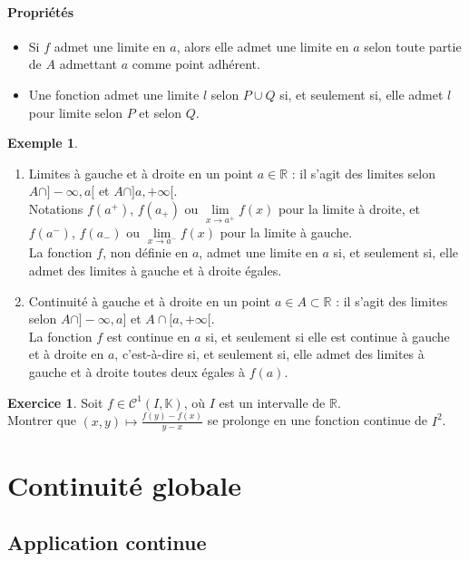 \documentclass[french]{article}
\newcommand{\R}{\mathbb{R}}
\newcommand{\K}{\mathbb{K}}
\theoremstyle{plain}
\theoremstyle{definition}
\newtheorem*{ex}{Exemple}
\newtheorem{exo}{Exercice}
\theoremstyle{remark}
\begin{document}
\paragraph{Propriétés}
\begin{itemize}
	\item Si $f$ admet une limite en $a$, alors elle admet une limite en $a$ selon toute partie de $A$ admettant $a$ comme point adhérent.
	\item Une fonction admet une limite $l$ selon $P\cup Q$ si, et seulement si, elle admet $l$ pour limite selon $P$ et selon $Q$.
\end{itemize}

\begin{ex}
	\begin{enumerate}
		\item Limites à gauche et à droite en un point $a\in\R$ : il s'agit des limites selon $A\cap]-\infty,a[$ et $A\cap]a,+\infty[$.\\
		Notations $f(a^+)$, $f(a_+)$ ou $\underset{x\to a^+}{\lim}f(x)$ pour la limite à droite, et $f(a^-)$, $f(a_-)$ ou $\underset{x\to a^-}{\lim}f(x)$ pour la limite à gauche. \\
		La fonction $f$, non définie en $a$, admet une limite en $a$ si, et seulement si, elle admet des limites à gauche et à droite égales.
		\item Continuité à gauche et à droite en un point $a\in A\subset\R$ : il s'agit des limites selon $A\cap]-\infty,a]$ et $A\cap[a,+\infty[$.\\
		La fonction $f$ est continue en $a$ si, et seulement si elle est continue à gauche et à droite en $a$, c'est-à-dire si, et seulement si, elle admet des limites à gauche et à droite toutes deux égales à $f(a)$.
	\end{enumerate}
\end{ex}

\begin{exo}
	Soit $f\in\mathcal{C}^1(I,\K)$, où $I$ est un intervalle de $\R$. \\
	Montrer que $(x,y)\mapsto\displaystyle\frac{f(y)-f(x)}{y-x}$ se prolonge en une fonction continue de $I^2$.
\end{exo}

\section{Continuité globale}

\subsection{Application continue}
\end{document}
